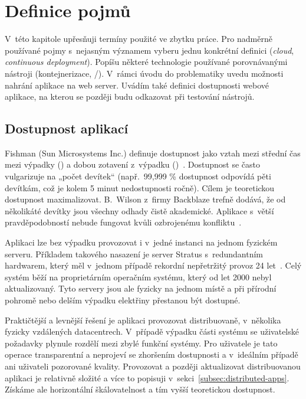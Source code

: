 \chapter{Definice pojmů}
    V~této kapitole upřesňuji termíny použité ve zbytku práce. Pro nadměrně používané pojmy s~nejasným významem vyberu jednu konkrétní definici (\textit{cloud}, \textit{continuous deployment}). Popíšu některé technologie používané porovnávanými \CI nástroji (kontejnerizace, /). V~rámci úvodu do problematiky \CICD uvedu možnosti nahrání aplikace na web server. Uvádím také definici dostupnosti webové aplikace, na kterou se později budu odkazovat při testování \CICD nástrojů.

    \section*{Dostupnost aplikací}
        Fishman (Sun Microsystems Inc.) definuje dostupnost jako vztah mezi střední čas mezi výpadky () a dobou zotavení z~výpadku ()~\cite{fishman-availability}. Dostupnost se často vulgarizuje na „počet devítek“ (např.~99,999 \% dostupnost odpovídá pěti devítkám, což je kolem 5 minut nedostupnosti ročně). Cílem je teoretickou dostupnost maximalizovat. B.~Wilson z~firmy Backblaze trefně dodává, že od několikáté devítky jsou všechny odhady čistě akademické. Aplikace s~větší pravděpodobností nebude fungovat kvůli ozbrojenému konfliktu~\cite{backblaze-availability}.

        Aplikaci lze bez výpadku provozovat i v~jedné instanci na jednom fyzickém serveru. Příkladem takového nasazení je server Stratus s~redundantním hardwarem, který měl v~jednom případě rekordní nepřetržitý provoz 24 let~\cite{thibodeau-longest-uptime}. Celý systém běží na proprietárním operačním systému, který od let 2000 nebyl aktualizovaný. Tyto servery jsou ale fyzicky na jednom místě a při přírodní pohromě nebo delším výpadku elektřiny přestanou být dostupné.

        Praktičtější a levnější řešení je aplikaci provozovat distribuovaně, v~několika fyzicky vzdálených datacentrech. V~případě výpadku části systému se uživatelské požadavky plynule rozdělí mezi zbylé funkční systémy. Pro uživatele je tato operace transparentní a neprojeví se zhoršením dostupnosti a v~ideálním případě ani uživateli pozorované kvality. Provozovat a později aktualizovat distribuovanou aplikaci je relativně složité a více to popisuji v~sekci~\ref{subsec:distributed-apps}. Získáme ale horizontální škálovatelnost a tím vyšší teoretickou dostupnost.

